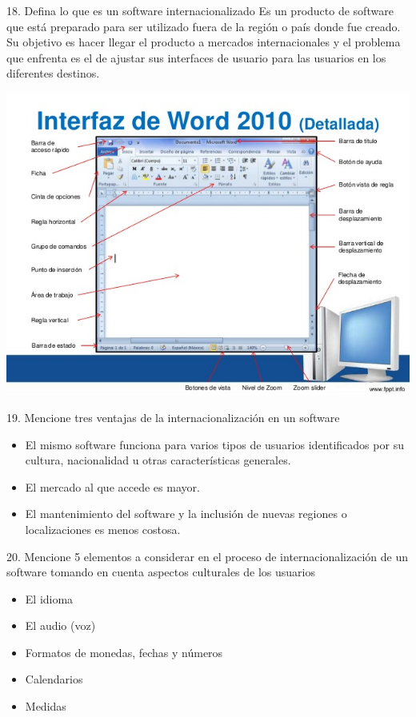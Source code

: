 \documentclass{beamer}
\begin{document}
\begin{frame}
\begin{block}{18. Defina lo que es un software internacionalizado}
Es un producto de software que está preparado para ser utilizado fuera de la región o país
donde fue creado. Su objetivo es hacer llegar el producto a mercados internacionales y el
problema que enfrenta es el de ajustar sus interfaces de usuario para las usuarios en los
diferentes destinos.
\begin{center}
\includegraphics[scale = 0.25]{12.png}
\end{center}
\end{block}
\end{frame}


\begin{frame}
\begin{block}{19. Mencione tres ventajas de la internacionalización en un software}
\begin{itemize}
 \item El mismo software funciona para varios tipos de usuarios identificados por su cultura, nacionalidad u otras características generales.
 \item El mercado al que accede es mayor.
 \item El mantenimiento del software y la inclusión de nuevas regiones o localizaciones es menos costosa.
\end{itemize}
\end{block}
\end{frame}


\begin{frame}
\begin{block}{20. Mencione 5 elementos a considerar en el proceso de internacionalización de un software
tomando en cuenta aspectos culturales de los usuarios}
\begin{itemize}
 \item El idioma
 \item El audio (voz)
 \item Formatos de monedas, fechas y números
 \item Calendarios
 \item Medidas
\end{itemize}
\end{block}
\end{frame}
\end{document}
